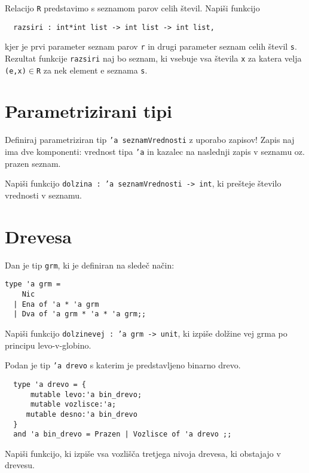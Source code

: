 \begin{ex}
  Relacijo \texttt{R} predstavimo s seznamom parov celih \v
  stevil. Napi\v si funkcijo

  \begin{verbatim}
  razsiri : int*int list -> int list -> int list,
  \end{verbatim}

  kjer je prvi parameter seznam parov \texttt{r} in drugi parameter
  seznam celih \v stevil \texttt{s}. Rezultat funkcije
  \texttt{razsiri} naj bo seznam, ki vsebuje vsa \v stevila \texttt{x}
  za katera velja \texttt{(e,x)}$\in$\texttt{R} za nek element e
  seznama \texttt{s}.


\end{ex} 

\section{Parametrizirani tipi}

\begin{ex}
  Definiraj parametriziran tip \texttt{'a seznamVrednosti} z uporabo zapisov!
  Zapis naj ima dve komponenti: vrednost tipa \texttt{'a} in kazalec na
  naslednji zapis v seznamu oz. prazen seznam.

  Napi\v si funkcijo \texttt{dolzina : 'a seznamVrednosti -> int}, ki
  pre\v steje \v stevilo vrednosti v seznamu.


\end{ex} 

\section{Drevesa}

\begin{ex}
  Dan je tip \texttt{grm}, ki je definiran na slede\v c na\v cin:

\begin{verbatim}
type 'a grm = 
    Nic 
  | Ena of 'a * 'a grm 
  | Dva of 'a grm * 'a * 'a grm;;
\end{verbatim}

  Napi\v si funkcijo \texttt{dolzinevej : 'a grm -> unit}, ki izpi\v
  se dol\v zine vej grma po principu levo-v-globino.


\end{ex} 
\begin{ex} 
  Podan je tip \texttt{'a drevo} s katerim je predstavljeno binarno
  drevo.

  \begin{verbatim}
  type 'a drevo = { 
      mutable levo:'a bin_drevo; 
      mutable vozlisce:'a; 
     mutable desno:'a bin_drevo 
  } 
  and 'a bin_drevo = Prazen | Vozlisce of 'a drevo ;;
  \end{verbatim}

  Napi\v si funkcijo, ki izpi\v se vsa vozli\v s\v ca tretjega nivoja
  drevesa, ki obstajajo v drevesu.


\end{ex} 

